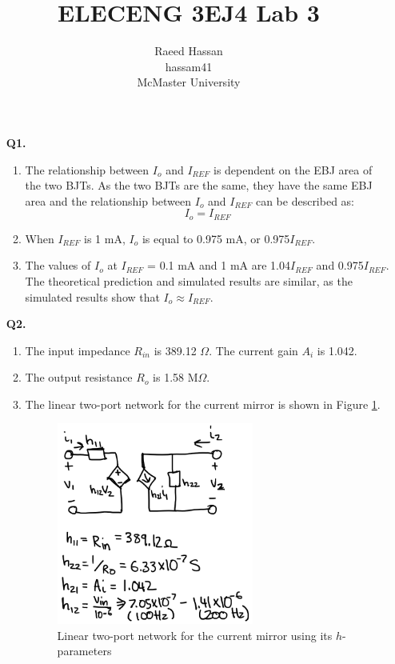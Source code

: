 \documentclass[12pt]{article}
\title{ELECENG 3EJ4 Lab 3}
\author{Raeed Hassan \\ hassam41 \\ McMaster University}
\begin{document}
\maketitle
\pagebreak
\begin{itemize}
    \section*{Part 1}
    \item [\textbf{Q1.}]
    \begin{enumerate}
        \item The relationship between $I_o$ and $I_{REF}$ is dependent on the EBJ area of the two BJTs. As the two BJTs are the same, they have the same EBJ area and the relationship between $I_o$ and $I_{REF}$ can be described as:
        \begin{equation*}
            I_o = I_{REF}
        \end{equation*}
        \item When $I_{REF}$ is 1 mA, $I_o$ is equal to 0.975 mA, or 0.975$I_{REF}$.
        \item The values of $I_o$ at $I_{REF}$ = 0.1 mA and 1 mA are 1.04$I_{REF}$ and 0.975$I_{REF}$. The theoretical prediction and simulated results are similar, as the simulated results show that $I_o \approx I_{REF}$. 
    \end{enumerate}
    \item [\textbf{Q2.}]
    \begin{enumerate}
        \item The input impedance $R_{in}$ is 389.12 $\Omega$. The current gain $A_i$ is 1.042.
        \item The output resistance $R_o$ is 1.58 M$\Omega$.
        \item The linear two-port network for the current mirror is shown in Figure \ref{fig:q2.3}.
        \begin{figure}[!ht]
            \centering
            \includegraphics[width=0.65\textwidth]{q2.3}
            \caption{\label{fig:q2.3}Linear two-port network for the current mirror using its $h$-parameters}
        \end{figure}
    \end{enumerate}
    \newpage

\end{itemize}
\end{document}
